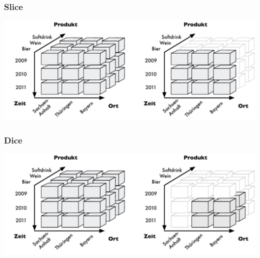        
        \begin{frame}
        
        \frametitle{Slice}
        
        \begin{center}
        \includegraphics[width=.95\textwidth]{fig6/OLAP-Slice.pdf}
        \end{center}
        
        \end{frame}
        
        \begin{frame}
        
        \frametitle{Dice}
        
        \begin{center}
        \includegraphics[width=.95\textwidth]{fig6/OLAP-Dice.pdf}
        \end{center}
        
        \end{frame}
        

